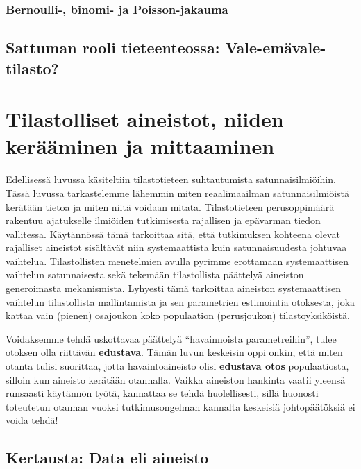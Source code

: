 \documentclass[
]{book}
\begin{document}
\hypertarget{bernoulli--binomi--ja-poisson-jakauma}{%
\subsection{Bernoulli-, binomi- ja Poisson-jakauma}\label{bernoulli--binomi--ja-poisson-jakauma}}

\hypertarget{alaluku46}{%
\section{Sattuman rooli tieteenteossa: Vale-emävale-tilasto?}\label{alaluku46}}

\hypertarget{luku5}{%
\chapter{Tilastolliset aineistot, niiden kerääminen ja mittaaminen}\label{luku5}}

Edellisessä luvussa käsiteltiin tilastotieteen suhtautumista satunnaisilmiöihin. Tässä luvussa tarkastelemme lähemmin miten reaalimaailman satunnaisilmiöistä kerätään tietoa ja miten niitä voidaan mitata. Tilastotieteen perusoppimäärä rakentuu ajatukselle ilmiöiden tutkimisesta rajallisen ja epävarman tiedon vallitessa. Käytännössä tämä tarkoittaa sitä, että tutkimuksen kohteena olevat rajalliset aineistot sisältävät niin systemaattista kuin satunnaisuudesta johtuvaa vaihtelua. Tilastollisten menetelmien avulla pyrimme erottamaan systemaattisen vaihtelun satunnaisesta sekä tekemään tilastollista päättelyä aineiston generoimasta mekanismista. Lyhyesti tämä tarkoittaa aineiston systemaattisen vaihtelun tilastollista mallintamista ja sen parametrien estimointia otoksesta, joka kattaa vain (pienen) osajoukon koko populaation (perusjoukon) tilastoyksiköistä.

Voidaksemme tehdä uskottavaa päättelyä ``havainnoista parametreihin'', tulee otoksen olla riittävän \textbf{edustava}. Tämän luvun keskeisin oppi onkin, että miten otanta tulisi suorittaa, jotta havaintoaineisto olisi \textbf{edustava otos} populaatiosta, silloin kun aineisto kerätään otannalla. Vaikka aineiston hankinta vaatii yleensä runsaasti käytännön työtä, kannattaa se tehdä huolellisesti, sillä huonosti toteutetun otannan vuoksi tutkimusongelman kannalta keskeisiä johtopäätöksiä ei voida tehdä!

\hypertarget{alaluku51}{%
\section{Kertausta: Data eli aineisto}\label{alaluku51}}
\end{document}
